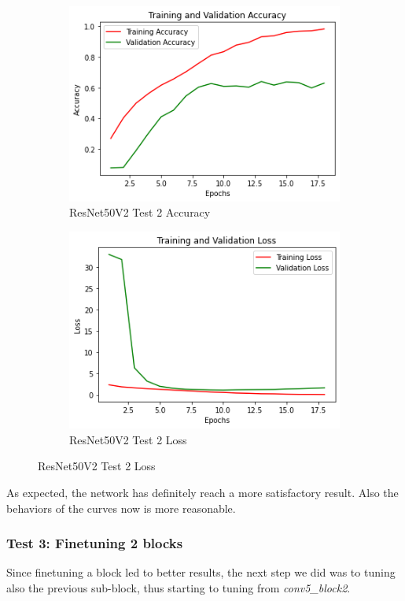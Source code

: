 \begin{figure}[H]
	\begin{subfigure}{0.5\textwidth}
		\includegraphics[width=0.9\linewidth]{img/resnet50v2/resnet50finetuned1acc.png} 
		\caption{ResNet50V2 Test 2 Accuracy}
		\label{fig:resnet50finetuned1acc}
	\end{subfigure}
	\begin{subfigure}{0.5\textwidth}
		\includegraphics[width=0.9\linewidth]{img/resnet50v2/resnet50finetuned1loss.png}
		\caption{ResNet50V2 Test 2 Loss}
		\label{fig:resnet50finetuned1loss}
	\end{subfigure}
\end{figure}

\noindent As expected, the network has definitely reach a more satisfactory result. Also the behaviors of the curves now is more reasonable. 



\subsubsection{Test 3: Finetuning 2 blocks}
Since finetuning a block led to better results, the next step we did was to tuning also the previous sub-block, thus starting to tuning from \textit{conv5\_block2}.

